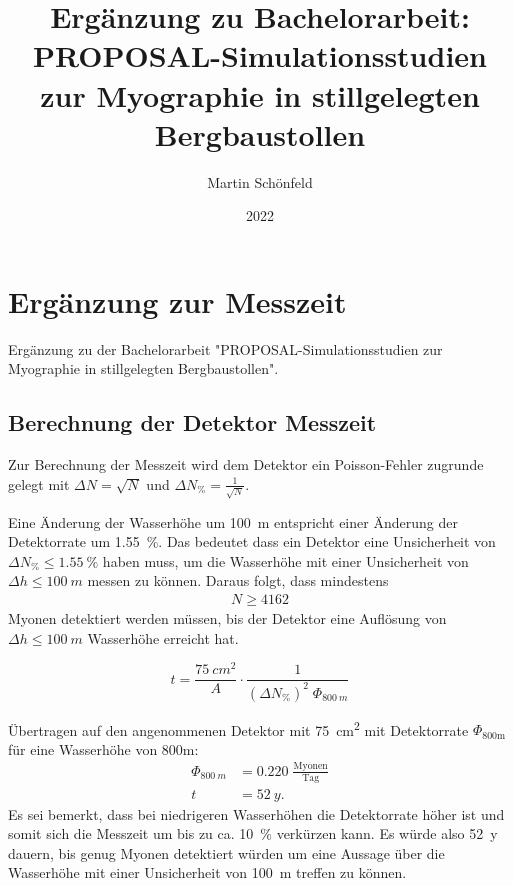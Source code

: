 \documentclass[
  tucolor,       %
  BCOR=12mm,     %
  parskip=half,  %
  open=any,      %
  cleardoublepage=plain,  %
]{tudothesis}
\author{Martin Schönfeld}
\title{Ergänzung zu Bachelorarbeit: PROPOSAL-Simulationsstudien zur Myographie in stillgelegten Bergbaustollen}
\date{2022}
\begin{document}
% 
 

% 

\mainmatter

\chapter{Ergänzung zur Messzeit}
Ergänzung zu der Bachelorarbeit 
"PROPOSAL-Simulationsstudien zur Myographie in stillgelegten Bergbaustollen".
\section{Berechnung der Detektor Messzeit}

Zur Berechnung der Messzeit wird dem Detektor ein Poisson-Fehler zugrunde gelegt
mit $\Delta N = \sqrt{N}$ und $\Delta N_\%  = \frac{1}{\sqrt{N}}$.

Eine Änderung der Wasserhöhe um \SI[]{100}[]{m} entspricht einer Änderung
der Detektorrate um \SI[]{1,55}[]{\%}.
Das bedeutet dass ein Detektor eine Unsicherheit von  $\Delta N_\% \leq \SI[]{1,55}[]{\%}$
haben muss, um die Wasserhöhe mit einer Unsicherheit von 
$\Delta h \leq \SI[]{100}[]{m}$ messen zu können.
Daraus folgt, dass mindestens 
\begin{align}
  N \geq  4162
\end{align}
 Myonen detektiert werden müssen, bis der Detektor 
eine Auflösung von $\Delta h \leq \SI[]{100}[]{m}$ Wasserhöhe erreicht hat.

\begin{equation}
  t = \frac{\SI[]{75}[]{cm^2}}{A} \cdot \frac{1}{(\Delta N_\%)^2 \; \Phi_{\SI[]{800}[]{m}}}
\end{equation}

Übertragen auf den angenommenen Detektor mit \SI[]{75}[]{cm^2} mit 
Detektorrate $\Phi_\mathrm{800m}$ für eine Wasserhöhe von 800m:
\begin{align}
  \Phi_{\SI[]{800}[]{m}} &= \num{0,220} \; \frac{\mathrm{Myonen}}{\mathrm{Tag}} \\
  t &= \SI[]{52}[]{y}.
\end{align}
Es sei bemerkt, dass bei niedrigeren Wasserhöhen die Detektorrate höher ist und somit sich die Messzeit
um bis zu ca. \SI[]{10}[]{\%} verkürzen kann.
Es würde also \SI[]{52}[]{y} dauern, bis genug Myonen detektiert würden
um eine Aussage über die Wasserhöhe mit einer Unsicherheit von \SI[]{100}[]{m} 
treffen zu können. 
\end{document}
